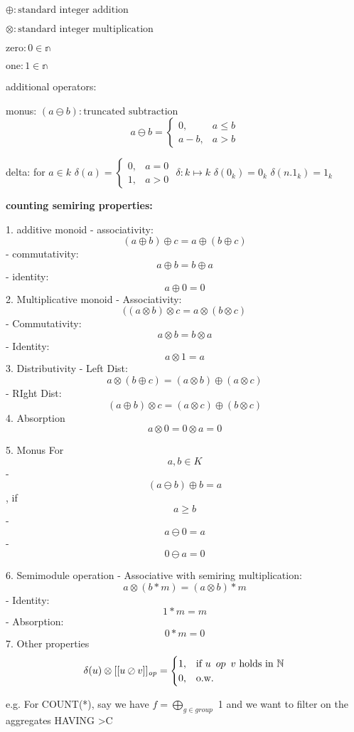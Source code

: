 \documentclass[10pt,a4paper]{scrartcl}
\theoremstyle{definition}
\theoremstyle{remark}
\begin{document}
$\oplus : \text{standard integer addition}$

$\otimes : \text{standard integer multiplication}$

$\text{zero} : 0 \in \mathbb{n}$

$\text{one} : 1 \in \mathbb{n}$

additional operators:

monus: $(a \ominus b): \text{truncated subtraction}$
$$ a \ominus b = \begin{cases} 0, &  a\leq b\\ a-b,& a>b \end{cases}$$

delta: 
for $a \in k$
$\delta(a) = \begin{cases} 0, & a=0\\ 1, & a>0 \end{cases}$
$\delta:k \mapsto k $
$\delta(0_k)=0_k$
$\delta(n.1_k)=1_k$


\textbf{counting semiring properties:}

1. additive monoid
- associativity: $$(a \oplus b) \oplus c = a \oplus (b\oplus c)$$
- commutativity: $$a \oplus b = b \oplus a$$
- identity: $$a \oplus 0 = 0$$
2. Multiplicative monoid
- Associativity: $$( (a \otimes b) \otimes c = a \otimes (b\otimes c)$$
- Commutativity: $$a \otimes b = b \otimes a$$
- Identity: $$a \otimes 1 = a$$
3. Distributivity
- Left Dist: $$a \otimes (b \oplus c)= (a \otimes b)\oplus(a \otimes c)$$
- RIght Dist: $$(a \oplus b)\otimes c=(a \otimes c)\oplus(b \otimes c)$$
 4. Absorption
$$a \otimes 0 = 0 \otimes a = 0$$

5. Monus \newline
For $$a, b \in K$$
- $$(a \ominus b) \oplus b =a$$, if $$a \geq b$$
- $$a \ominus 0 =a$$
- $$0 \ominus a = 0$$

6. Semimodule operation
- Associative with semiring multiplication: $$a \otimes (b * m)= (a \otimes b) * m$$
- Identity: $$1*m=m$$
- Absorption: $$0*m=0$$
7. Other properties
$$
 \delta(u)\otimes[[u \oslash   v]]_{\mathit{op}}=\begin{cases}1, & \text{if } u\hspace{0.5em} op\hspace{0.5em} v \text{ holds in } \mathbb{N} \\
0,&\text{o.w.}\end{cases}
$$

e.g. For COUNT(*), say we have $f=\bigoplus_{g \in group}$ 1 and we want to filter on the aggregates HAVING >C
\end{document}
